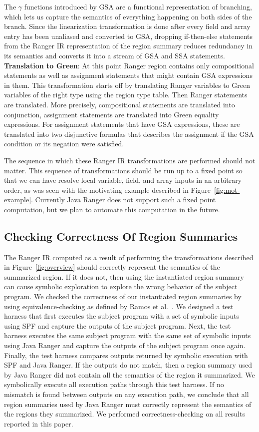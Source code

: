 %
The $\gamma$ functions introduced by GSA are a functional representation of branching, which lets us
capture the semantics of everything happening on both sides of the branch.
%
Since the linearization transformation is done after every field and array entry has been unaliased and converted to
GSA, dropping if-then-else statements from the Ranger IR representation of the region summary reduces redundancy in its
semantics and converts it into a stream of GSA and SSA statements.\\
\textbf{Translation to Green}:
%
At this point Ranger region contains only compositional statements as well as assignment statements that might contain GSA expressions in them.
%
This transformation starts off by translating Ranger variables to Green variables of the right type using the region type table.
%
Then Ranger statements are translated. More precisely, compositional statements are translated into conjunction, assignment statements are translated into Green equality expressions.
%
For assignment statements that have GSA expressions, these are translated into two disjunctive formulas that describes the assignment if the GSA condition or its negation were satisfied.

The sequence in which these Ranger IR transformations are performed should not matter.
%
This sequence of transformations should be run up to a fixed point so that we can have resolve local
variable, field, and array inputs in an arbitrary order, as was seen with the motivating example described in Figure~\ref{fig:mot-example}.
%
Currently Java Ranger does not support such a fixed point computation, but we plan to automate this computation in the future.

\subsection{Checking Correctness Of Region Summaries}
The Ranger IR computed as a result of performing the transformations described in Figure~\ref{fig:overview} should
correctly represent the semantics of the summarized region.
%
If it does not, then using the instantiated region summary can cause symbolic exploration to explore the wrong behavior
of the subject program.
%
We checked the correctness of our instantiated region summaries by using equivalence-checking as defined by Ramos et al.~\cite{ramos}.
%
We designed a test harness that first executes the subject program with a set of symbolic inputs using SPF and
capture the outputs of the subject program.
%
Next, the test harness executes the same subject program with the same set of symbolic inputs using Java Ranger and
capture the outputs of the subject program once again.
%
Finally, the test harness compares outputs returned by symbolic execution with SPF and Java Ranger.
%
If the outputs do not match, then a region summary used by Java Ranger did not contain all the semantics
of the region it summarized.
%
We symbolically execute all execution paths through this test harness.
%
If no mismatch is found between outputs on any execution path, we conclude that all region summaries used by Java Ranger
must correctly represent the semantics of the regions they summarized.
%
We performed correctness-checking on all results reported in this paper.
